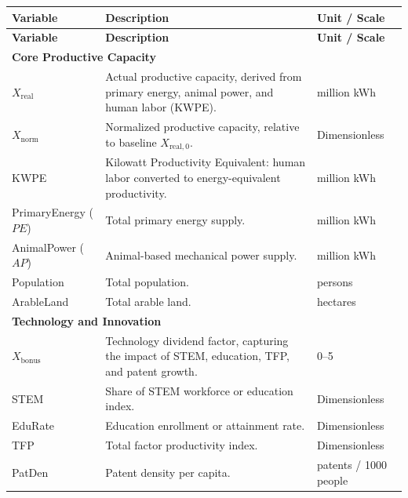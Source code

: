 \documentclass[12pt,a4paper]{article}
\begin{document}
\begin{longtable}{p{3cm} p{9cm} p{3cm}}
\hline
\textbf{Variable} & \textbf{Description} & \textbf{Unit / Scale} \\
\hline
\endfirsthead

\hline
\textbf{Variable} & \textbf{Description} & \textbf{Unit / Scale} \\
\hline
\endhead

\multicolumn{3}{l}{\textbf{Core Productive Capacity}} \\
$X_{\mathrm{real}}$   & Actual productive capacity, derived from primary energy, animal power, and human labor (KWPE). & million kWh \\
$X_{\mathrm{norm}}$   & Normalized productive capacity, relative to baseline $X_{\mathrm{real},0}$. & Dimensionless \\
KWPE                  & Kilowatt Productivity Equivalent: human labor converted to energy-equivalent productivity. & million kWh \\
PrimaryEnergy ($PE$)  & Total primary energy supply. & million kWh \\
AnimalPower ($AP$)    & Animal-based mechanical power supply. & million kWh \\
Population            & Total population. & persons \\
ArableLand            & Total arable land. & hectares \\

\multicolumn{3}{l}{\textbf{Technology and Innovation}} \\
$X_{\mathrm{bonus}}$  & Technology dividend factor, capturing the impact of STEM, education, TFP, and patent growth. & 0–5 \\
STEM                  & Share of STEM workforce or education index. & Dimensionless \\
EduRate               & Education enrollment or attainment rate. & Dimensionless \\
TFP                   & Total factor productivity index. & Dimensionless \\
PatDen                & Patent density per capita. & patents / 1000 people \\


\end{longtable}
\end{document}
